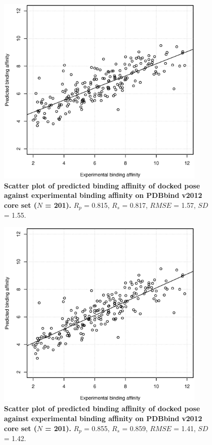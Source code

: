\documentclass[10pt]{article}
\begin{document}
\begin{figure}[!ht]
\begin{center}
\includegraphics[width=4in]{pK-idockConfsRFScoreMax.eps}
\end{center}
\caption{
{\bf Scatter plot of predicted binding affinity of docked pose against experimental binding affinity on PDBbind v2012 core set ($N$ = 201).} $R_p$ = 0.815, $R_s$ = 0.817, $RMSE$ = 1.57, $SD$ = 1.55.
}
\label{pK-idockConfsRFScoreMax}
\end{figure}

\begin{figure}[!ht]
\begin{center}
\includegraphics[width=4in]{pK-idockConf1RFScore.eps}
\end{center}
\caption{
{\bf Scatter plot of predicted binding affinity of docked pose against experimental binding affinity on PDBbind v2012 core set ($N$ = 201).} $R_p$ = 0.855, $R_s$ = 0.859, $RMSE$ = 1.41, $SD$ = 1.42.
}
\label{pK-idockConf1RFScore}
\end{figure}
\end{document}
